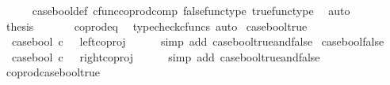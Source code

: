 \begin{isabellebody}
\ \ \ \ \isamarkupfalse%
\ case{\isacharunderscore}{\kern0pt}bool{\isacharunderscore}{\kern0pt}def{}\ cfunc{\isacharunderscore}{\kern0pt}coprod{\isacharunderscore}{\kern0pt}comp\ false{\isacharunderscore}{\kern0pt}func{\isacharunderscore}{\kern0pt}type\ true{\isacharunderscore}{\kern0pt}func{\isacharunderscore}{\kern0pt}type\ \isamarkupfalse%
\ auto\isanewline
\ \ \isamarkupfalse%
\ \isamarkupfalse%
\ {\isacharquery}{\kern0pt}thesis\ \isanewline
\ \ \ \ \isamarkupfalse%
\ coprod{\isacharunderscore}{\kern0pt}eq{}\ \isamarkupfalse%
\ {\isacharparenleft}{\kern0pt}typecheck{\isacharunderscore}{\kern0pt}cfuncs{\isacharcomma}{\kern0pt}\ auto{\isacharparenright}{\kern0pt}\isanewline
{}\isamarkupfalse%
%
\endisatagproof
{\isafoldproof}%
%
\isadelimproof
\isanewline
%
\endisadelimproof
\isanewline
{}\isamarkupfalse%
\ case{\isacharunderscore}{\kern0pt}bool{\isacharunderscore}{\kern0pt}true{\isacharcolon}{\kern0pt}\isanewline
\ \ {\isachardoublequoteopen}case{\isacharunderscore}{\kern0pt}bool\ {\isasymcirc}\isactrlsub c\ {\isasymt}\ {\isacharequal}{\kern0pt}\ left{\isacharunderscore}{\kern0pt}coproj\ {\isasymone}\ {\isasymone}{\isachardoublequoteclose}\isanewline
%
\isadelimproof
\ \ %
\endisadelimproof
%
\isatagproof
{}\isamarkupfalse%
\ {\isacharparenleft}{\kern0pt}simp\ add{\isacharcolon}{\kern0pt}\ case{\isacharunderscore}{\kern0pt}bool{\isacharunderscore}{\kern0pt}true{\isacharunderscore}{\kern0pt}and{\isacharunderscore}{\kern0pt}false{\isacharparenright}{\kern0pt}%
\endisatagproof
{\isafoldproof}%
%
\isadelimproof
\isanewline
%
\endisadelimproof
\isanewline
{}\isamarkupfalse%
\ case{\isacharunderscore}{\kern0pt}bool{\isacharunderscore}{\kern0pt}false{\isacharcolon}{\kern0pt}\isanewline
\ \ {\isachardoublequoteopen}case{\isacharunderscore}{\kern0pt}bool\ {\isasymcirc}\isactrlsub c\ {\isasymf}\ {\isacharequal}{\kern0pt}\ right{\isacharunderscore}{\kern0pt}coproj\ {\isasymone}\ {\isasymone}{\isachardoublequoteclose}\isanewline
%
\isadelimproof
\ \ %
\endisadelimproof
%
\isatagproof
{}\isamarkupfalse%
\ {\isacharparenleft}{\kern0pt}simp\ add{\isacharcolon}{\kern0pt}\ case{\isacharunderscore}{\kern0pt}bool{\isacharunderscore}{\kern0pt}true{\isacharunderscore}{\kern0pt}and{\isacharunderscore}{\kern0pt}false{\isacharparenright}{\kern0pt}%
\endisatagproof
{\isafoldproof}%
%
\isadelimproof
\isanewline
%
\endisadelimproof
\isanewline
{}\isamarkupfalse%
\ coprod{\isacharunderscore}{\kern0pt}case{\isacharunderscore}{\kern0pt}bool{\isacharunderscore}{\kern0pt}true{\isacharcolon}{\kern0pt}\isanewline

\end{isabellebody}
